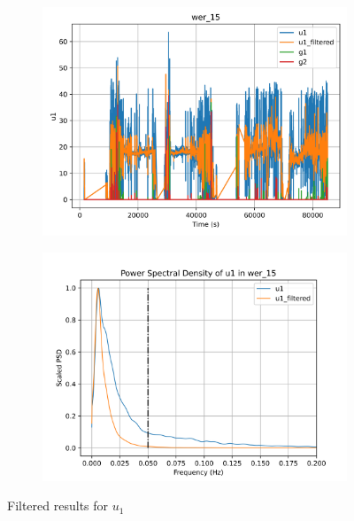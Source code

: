 \begin{figure}[H]

\begin{minipage}{0.49\textwidth}
        \begin{figure}[H]
                \centering
                \includegraphics[width = \textwidth]{./figs/trk_filt/wer_15/u1.png}
        \end{figure}
\end{minipage}
\begin{minipage}{0.49\textwidth}
        \begin{figure}[H]
                \centering
                \includegraphics[width = \textwidth]{./figs/trk_filt/wer_15/u1_psd.png}
        \end{figure}
\end{minipage}
\caption{Filtered results for $u_1$}

\end{figure}


